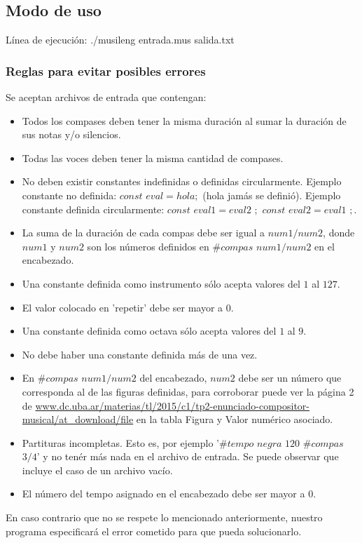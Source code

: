 \subsection{Modo de uso}
Línea de ejecución: ./musileng entrada.mus salida.txt

\subsubsection{Reglas para evitar posibles errores}
Se aceptan archivos de entrada que contengan:
\begin{itemize}
\item Todos los compases deben tener la misma duración al sumar la duración de sus notas y/o silencios.
\item Todas las voces deben tener la misma cantidad de compases.
\item No deben existir constantes indefinidas o definidas circularmente. Ejemplo constante no definida: $const$ $eval = hola;$ (hola jamás se definió). Ejemplo constante definida circularmente: $const$ $eval1 = eval2$ $;$ $const$ $eval2 = eval1$ $;$.
\item La suma de la duración de cada compas debe ser igual a $num1/num2$, donde $num1$ y $num2$ son los números definidos en $\#compas$ $num1/num2$ en el encabezado.
\item Una constante definida como instrumento sólo acepta valores del $1$ al $127$.
\item El valor colocado en 'repetir' debe ser mayor a $0$.
\item Una constante definida como octava sólo acepta valores del $1$ al $9$.
\item No debe haber una constante definida más de una vez.
\item En $\#compas$ $num1/num2$ del encabezado, $num2$ debe ser un número que corresponda al de las figuras definidas, para corroborar puede ver la página 2 de \url{www.dc.uba.ar/materias/tl/2015/c1/tp2-enunciado-compositor-musical/at_download/file} en la tabla Figura y Valor numérico asociado.
\item Partituras incompletas. Esto es, por ejemplo '$\#tempo$ $negra$ $120$ $\#compas$ $3/4$' y no tenér más nada en el archivo de entrada. Se puede observar que incluye el caso de un archivo vacío.
\item El número del tempo asignado en el encabezado debe ser mayor a $0$.
\end{itemize}
En caso contrario que no se respete lo mencionado anteriormente, nuestro programa especificará el error cometido para que pueda solucionarlo.

